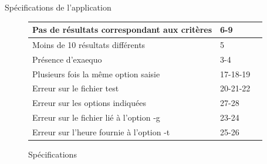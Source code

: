 \documentclass[11pt]{article}
\begin{document}
\begin{section}{Spécifications de l'application}
\begin{figure}[h]
\begin{center}
{\begin{tabular}{| p{7cm} | p{7cm} | p{2cm} |}
\hline

Pas de résultats correspondant aux critères & 6-9 \\

\hline

Moins de 10 résultats différents & 5\\

\hline

Présence d'exaequo & 3-4 \\

\hline

Plusieurs fois la même option saisie & 17-18-19 \\

\hline

Erreur sur le fichier test & 20-21-22 \\

\hline

Erreur sur les options indiquées & 27-28 \\

\hline

Erreur sur le fichier lié à l'option -g & 23-24 \\

\hline

Erreur sur l'heure fournie à l'option -t & 25-26 \\

\hline
\end{tabular}}
\end{center}
\caption{Spécifications}
\label{Spécifications}
\end{figure}
\end{section}
\end{document}
